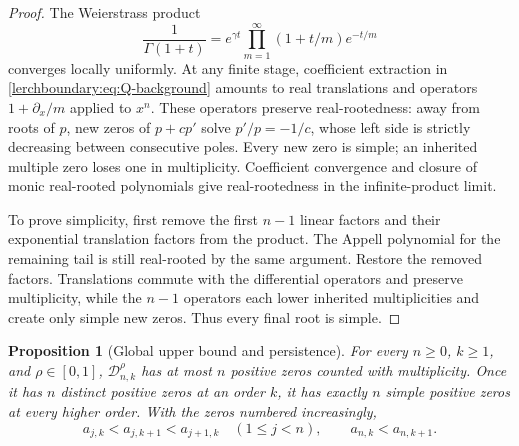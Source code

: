 \documentclass[11pt,a4paper]{article}
\newtheorem{proposition}[theorem]{Proposition}
\theoremstyle{definition}
\theoremstyle{remark}
\numberwithin{equation}{section}
\begin{document}
\begin{proof}
The Weierstrass product \cite{DLMFGamma}
\[
 \frac1{\Gamma(1+t)}
 =e^{\gamma t}\prod_{m=1}^{\infty}(1+t/m)e^{-t/m}
\]
converges locally uniformly. At any finite stage, coefficient
extraction in \eqref{lerchboundary:eq:Q-background} amounts to real
translations and operators $1+\partial_x/m$ applied to $x^n$.
These operators preserve real-rootedness: away from roots of $p$,
new zeros of $p+cp'$ solve $p'/p=-1/c$, whose left side is strictly
decreasing between consecutive poles. Every new zero is simple;
an inherited multiple zero loses one in multiplicity.
Coefficient convergence and closure of monic real-rooted polynomials
give real-rootedness in the infinite-product limit.

To prove simplicity, first remove the first $n-1$ linear factors and
their exponential translation factors from the product. The Appell
polynomial for the remaining tail is still real-rooted by the same
argument. Restore the removed factors. Translations commute with
the differential operators and preserve multiplicity, while the
$n-1$ operators each lower inherited multiplicities and create only
simple new zeros. Thus every final root is simple.
\end{proof}

\begin{proposition}[Global upper bound and persistence]
\label{lerchboundary:prop:bound-background}
For every $n\geq0$, $k\geq1$, and $\rho\in[0,1]$,
$\mathcal D_{n,k}^{\rho}$ has at most $n$ positive zeros counted
with multiplicity. Once it has $n$ distinct positive zeros at an
order $k$, it has exactly $n$ simple positive zeros at every higher
order. With the zeros numbered increasingly,
\[
 a_{j,k}<a_{j,k+1}<a_{j+1,k}\quad(1\leq j<n),
 \qquad a_{n,k}<a_{n,k+1}.
\]
\end{proposition}
\end{document}
